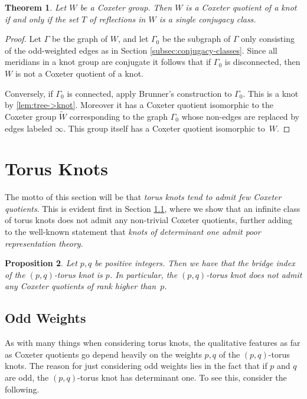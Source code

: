 \documentclass{article}
\newtheorem{theorem}{Theorem}[section]
\newtheorem{proposition}[theorem]{Proposition}
\theoremstyle{definition}
\begin{document}
\begin{theorem}
Let $W$ be a Coxeter group. Then $W$ is a Coxeter quotient of a knot if and only if the set $T$ of reflections in $W$ is a single conjugacy class.
\end{theorem}

\begin{proof}
Let $\Gamma$ be the graph of $W$, and let $\Gamma_0$ be the subgraph of $\Gamma$ only consisting of the odd-weighted edges as in Section \ref{subsec:conjugacy-classes}. Since all meridians in a knot group are conjugate it follows that if $\Gamma_0$ is disconnected, then $W$ is not a Coxeter quotient of a knot.

Conversely, if $\Gamma_0$ is connected, apply Brunner's construction to $\Gamma_0$. This is a knot by \ref{lem:tree->knot}. Moreover it has a Coxeter quotient isomorphic to the Coxeter group $\widetilde{W}$ corresponding to the graph $\Gamma_0$ whose non-edges are replaced by edges labeled $\infty$. This group itself has a Coxeter quotient isomorphic to~$W$.
\end{proof}

\section{Torus Knots}\label{sec:torus-knots}
The motto of this section will be that \textit{torus knots tend to admit few Coxeter quotients}. This is evident first in Section \ref{subsec:odd-weights}, where we show that an infinite class of torus knots does not admit any non-trivial Coxeter quotients, further adding to the well-known statement that \textit{knots of determinant one admit poor representation theory}.

\begin{proposition}
Let $p, q$ be positive integers. Then we have that the bridge index of the $(p, q)$-torus knot is $p$. In particular, the $(p, q)$-torus knot does not admit any Coxeter quotients of rank higher than~$p$.
\end{proposition}

\subsection{Odd Weights}\label{subsec:odd-weights}
As with many things when considering torus knots, the qualitative features as far as Coxeter quotients go depend heavily on the weights $p, q$ of the $(p, q)$-torus knots. The reason for just considering odd weights lies in the fact that if $p$ and $q$ are odd, the $(p, q)$-torus knot has determinant one. To see this, consider the following.
\end{document}
